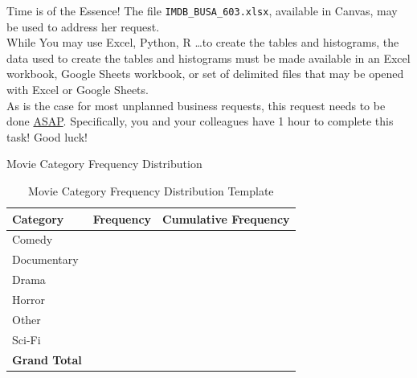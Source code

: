 \documentclass[pdf]{beamer}
\theoremstyle{remark}
\theoremstyle{definition}
\begin{document}
\begin{frame}[t]{Time is of the Essence!}
The file \texttt{IMDB\_BUSA\_603.xlsx},  available in Canvas, may be used to address her request. \\
\vspace{1.5ex} While You may use Excel, Python, R \ldots to create the tables and histograms, the data used to create the tables and histograms must be made available in an Excel workbook, Google Sheets workbook, or set of delimited files that may be opened with Excel or Google Sheets.\\
\vspace{1.5ex}
 As is the case for most unplanned business requests, this request needs to be done \underline{ASAP}. Specifically, you and your colleagues have 1 hour to complete this task!   Good luck!
\end{frame}

\begin{frame}[t]{Movie Category Frequency Distribution}
\begin{table}[htbp]
  \centering
  \captionsetup{justification=centering}
    \begin{tabular}{lrr}
    \rowcolor[rgb]{ .851,  .882,  .949} \textbf{Category} & \multicolumn{1}{l}{\textbf{Frequency}} & \multicolumn{1}{l}{\textbf{Cumulative Frequency}}\\
    \midrule
    Comedy &  &  \\
    Documentary &  &  \\
    Drama &  &  \\
    Horror &  &  \\
    Other &  & \\
    Sci-Fi &  & \\
    \midrule
    \rowcolor[rgb]{ .851,  .882,  .949} \textbf{Grand Total} &  & \\
    \end{tabular}%
     \caption{Movie Category Frequency Distribution Template}
  \label{tab:1}%
\end{table}%
\end{frame}
\end{document}

